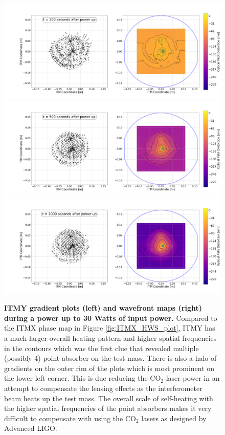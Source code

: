 	\begin{figure}[t!]
		\centering
		\includegraphics[width=0.55\textheight]{../Figures/1231726400_200dur_30W_ITMy.png}\quad
		\includegraphics[width=0.55\textheight]{../Figures/1231726400_500dur_30W_ITMy.png}\quad
		\includegraphics[width=0.55\textheight]{../Figures/1231726400_1000dur_30W_ITMy.png}\quad
		\caption[ITMY gradient plots (left) and wavefront maps (right) during a power up to 30 Watts of input power.]  
		{\textbf{ITMY gradient plots (left) and wavefront maps (right) during a power up to 30 Watts of input power.}
			Compared to the ITMX phase map in Figure \ref{fig:ITMX_HWS_plot}, ITMY has a much larger overall heating pattern and higher spatial frequencies in the contours which was the first clue that revealed multiple (possibly 4) point absorber on the test mass.  There is also a halo of gradients on the outer rim of the plots which is most prominent on the lower left corner.  This is due reducing the CO$_2$ laser power in an attempt to compensate the lensing effects as the interferometer beam heats up the test mass.  The overall scale of self-heating with the higher spatial frequencies of the point absorbers makes it very difficult to compensate with using the CO$_2$ lasers as designed by Advanced LIGO. }
		\label{fig:ITMY_HWS_plot}
	\end{figure}

